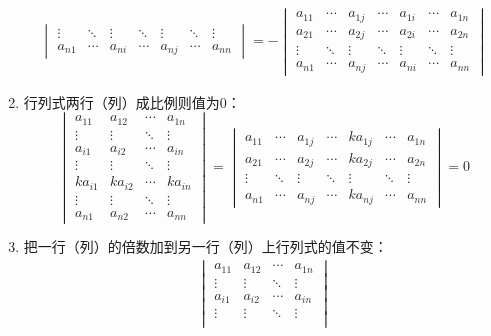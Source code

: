 \begin{property}
\begin{enumerate}
\begin{gather*}
\begin{vmatrix}
				\vdots & \ddots & \vdots & \ddots & \vdots & \ddots & \vdots \\
				a_{n1} & \cdots & a_{ni} & \cdots & a_{nj} & \cdots & a_{nn}
			\end{vmatrix}=-
			\begin{vmatrix}
				a_{11} & \cdots & a_{1j} & \cdots & a_{1i} & \cdots & a_{1n} \\
				a_{21} & \cdots & a_{2j} & \cdots & a_{2i} & \cdots & a_{2n} \\
				\vdots & \ddots & \vdots & \ddots & \vdots & \ddots & \vdots \\
				a_{n1} & \cdots & a_{nj} & \cdots & a_{ni} & \cdots & a_{nn}
			\end{vmatrix}
		\end{gather*}
		\item 行列式两行（列）成比例则值为$0$：
		\begin{equation*}
			\begin{vmatrix}
			a_{11} & a_{12} & \cdots & a_{1n} \\
			\vdots & \vdots & \ddots & \vdots \\
			a_{i1} & a_{i2} & \cdots & a_{in} \\
			\vdots & \vdots & \ddots & \vdots \\
			ka_{i1} & ka_{i2} & \cdots & ka_{in} \\
			\vdots & \vdots & \ddots & \vdots \\
			a_{n1} & a_{n2} & \cdots & a_{nn}
			\end{vmatrix}=
			\begin{vmatrix}
			a_{11} & \cdots & a_{1j} & \cdots & ka_{1j} & \cdots & a_{1n} \\
			a_{21} & \cdots & a_{2j} & \cdots & ka_{2j} & \cdots & a_{2n} \\
			\vdots & \ddots & \vdots & \ddots & \vdots & \ddots & \vdots \\
			a_{n1} & \cdots & a_{nj} & \cdots & ka_{nj} & \cdots & a_{nn}
			\end{vmatrix}=0
		\end{equation*}
		\item 把一行（列）的倍数加到另一行（列）上行列式的值不变：
		\begin{gather*}
			\begin{vmatrix}
				a_{11} & a_{12} & \cdots & a_{1n} \\
				\vdots & \vdots & \ddots & \vdots \\
				a_{i1} & a_{i2} & \cdots & a_{in} \\
				\vdots & \vdots & \ddots & \vdots \\

\end{vmatrix}
\end{gather*}
\end{enumerate}
\end{property}
